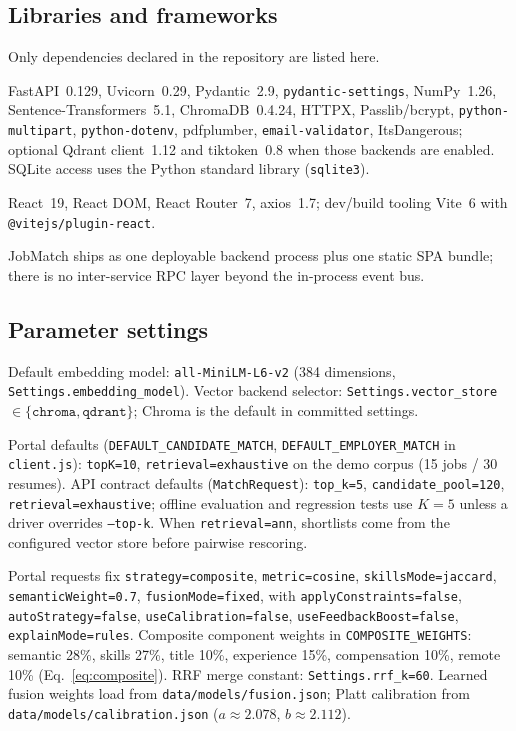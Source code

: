 \subsection{Libraries and frameworks}\label{sec:4-libraries}

Only dependencies declared in the repository are listed here.

FastAPI~0.129, Uvicorn~0.29, Pydantic~2.9, \texttt{pydantic-settings}, NumPy~1.26, Sentence-Transformers~5.1, ChromaDB~0.4.24, HTTPX, Passlib/bcrypt, \texttt{python-multipart}, \texttt{python-dotenv}, pdfplumber, \texttt{email-validator}, ItsDangerous; optional Qdrant client~1.12 and tiktoken~0.8 when those backends are enabled.
SQLite access uses the Python standard library (\texttt{sqlite3}).

React~19, React DOM, React Router~7, axios~1.7; dev/build tooling Vite~6 with \texttt{@vitejs/plugin-react}.

JobMatch ships as one deployable backend process plus one static SPA bundle; there is no inter-service RPC layer beyond the in-process event bus.

\subsection{Parameter settings}\label{sec:4-params}

Default embedding model: \texttt{all-MiniLM-L6-v2} (384 dimensions, \texttt{Settings.embedding\_model}).
Vector backend selector: \texttt{Settings.vector\_store} $\in \{\texttt{chroma}, \texttt{qdrant}\}$; Chroma is the default in committed settings.

Portal defaults (\texttt{DEFAULT\_CANDIDATE\_MATCH}, \texttt{DEFAULT\_EMPLOYER\_MATCH} in \texttt{client.js}): \texttt{topK=10}, \texttt{retrieval=exhaustive} on the demo corpus (15 jobs / 30 resumes).
API contract defaults (\texttt{MatchRequest}): \texttt{top\_k=5}, \texttt{candidate\_pool=120}, \texttt{retrieval=exhaustive}; offline evaluation and regression tests use $K{=}5$ unless a driver overrides \texttt{--top-k}.
When \texttt{retrieval=ann}, shortlists come from the configured vector store before pairwise rescoring.

Portal requests fix \texttt{strategy=composite}, \texttt{metric=cosine}, \texttt{skillsMode=jaccard}, \texttt{semanticWeight=0.7}, \texttt{fusionMode=fixed}, with \texttt{applyConstraints=false}, \texttt{autoStrategy=false}, \texttt{useCalibration=false}, \texttt{useFeedbackBoost=false}, \texttt{explainMode=rules}.
Composite component weights in \texttt{COMPOSITE\_WEIGHTS}: semantic 28\%, skills 27\%, title 10\%, experience 15\%, compensation 10\%, remote 10\% (Eq.~\ref{eq:composite}).
RRF merge constant: \texttt{Settings.rrf\_k=60}.
Learned fusion weights load from \texttt{data/models/fusion.json}; Platt calibration from \texttt{data/models/calibration.json} ($a{\approx}2.078$, $b{\approx}2.112$).

